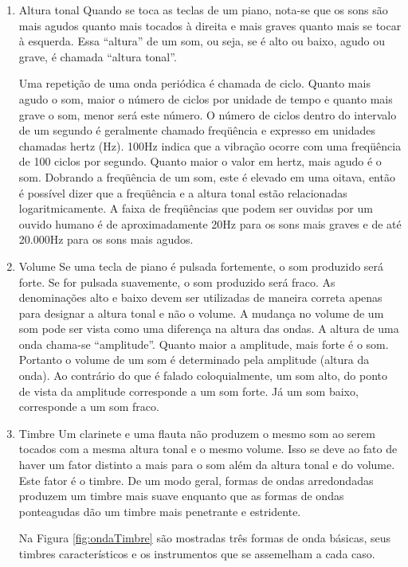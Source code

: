 \begin{enumerate}
\item Altura tonal \newline
Quando se toca as teclas de um piano, nota-se que os sons são mais agudos quanto mais tocados à direita e mais graves quanto mais se tocar à esquerda. Essa “altura” de um som, ou seja, se é alto ou baixo, agudo ou grave, é chamada “altura tonal”.

Uma repetição de uma onda periódica é chamada de ciclo. Quanto mais agudo o som, maior o número de ciclos por unidade de tempo e quanto mais grave o som, menor será este número. O número de ciclos dentro do intervalo de um segundo é geralmente chamado freqüência e expresso em unidades chamadas hertz (Hz). 100Hz indica que a vibração ocorre com uma freqüência de 100 ciclos por segundo. Quanto maior o valor em hertz, mais agudo é o som. Dobrando a freqüência de um som, este é elevado em uma oitava, então é possível dizer que a freqüência e a altura tonal estão relacionadas logaritmicamente. A faixa de freqüências que podem ser ouvidas por um ouvido humano é de aproximadamente 20Hz para os sons mais graves e de até 20.000Hz para os sons mais agudos.

\item Volume \newline
Se uma tecla de piano é pulsada fortemente, o som produzido será forte. Se for pulsada suavemente, o som produzido será fraco. As denominações alto e baixo devem ser utilizadas de maneira correta apenas para designar a altura tonal e não o volume. A mudança no volume de um som pode ser vista como uma diferença na altura das ondas. A altura de uma onda chama-se “amplitude”. Quanto maior a amplitude, mais forte é o som. Portanto o volume de um som é determinado pela amplitude (altura da onda). Ao contrário do que é falado coloquialmente, um som alto, do ponto de vista da amplitude corresponde a um som forte. Já um som baixo, corresponde a um som fraco.

\item Timbre \newline
Um clarinete e uma flauta não produzem o mesmo som ao serem tocados com a mesma altura tonal e o mesmo volume. Isso se deve ao fato de haver um fator distinto a mais para o som além da altura tonal e do volume. Este fator é o timbre. De um modo geral, formas de ondas arredondadas produzem um timbre mais suave enquanto que as formas de ondas ponteagudas dão um timbre mais penetrante e estridente.

Na Figura \ref{fig:ondaTimbre} são mostradas três formas de onda básicas, seus timbres característicos e os instrumentos que se assemelham a cada caso.


\end{enumerate}
